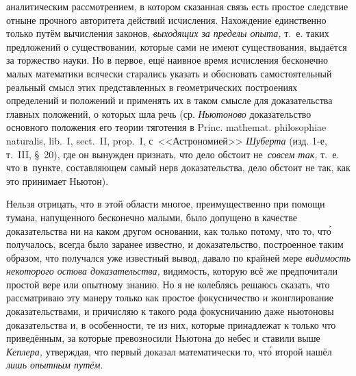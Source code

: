 аналитическим рассмотрением, в котором сказанная связь есть простое следствие
отныне прочного авторитета действий исчисления. Нахождение единственно только
путём вычисления законов, {\em выходящих за пределы опыта,} т.~е. таких
предложений о существовании, которые сами не имеют существования, выдаётся за
торжество науки. Но в первое, ещё наивное время исчисления бесконечно малых
математики всячески старались указать и обосновать самостоятельный реальный
смысл этих представленных в геометрических построениях определений и положений
и применять их в таком смысле для доказательства главных положений, о которых
шла речь (ср. {\em Ньютоново} доказательство основного положения его теории
тяготения в Princ. mathemat. philoso\-phiae naturalis, lib.~I, sect.~II,
prop.~I, с~<<Астрономией>> {\em Шуберта} (изд. 1-е, т.~III, \S~20), где он
вынужден признать, что дело обстоит не~{\em совсем так,} т.~е. что в~пункте,
составляющем самый нерв доказательства, дело обстоит не так,
как это принимает Ньютон).

Нельзя отрицать, что в этой области многое, преимущественно при помощи тумана,
напущенного бесконечно малыми, было допущено в качестве доказательства ни на
каком другом основании, как только потому, что то, чт\'{о} получалось, всегда было
заранее известно, и доказательство, построенное таким образом, что получался
уже известный вывод, давало по крайней мере {\em видимость некоторого остова
доказательства,} видимость, которую всё же предпочитали простой вере или
опытному знанию. Но я не колеблясь решаюсь сказать, что рассматриваю эту манеру
только как простое фокусничество и жонглирование доказательствами, и причисляю
к такого рода фокусничанию даже ньютоновы доказательства и, в особенности, те
из них, которые принадлежат к только что приведённым, за которые превозносили
Ньютона до небес и ставили выше {\em Кеплера,} утверждая, что первый доказал
математически то, чт\'{о} второй нашёл {\em лишь опытным путём}.

